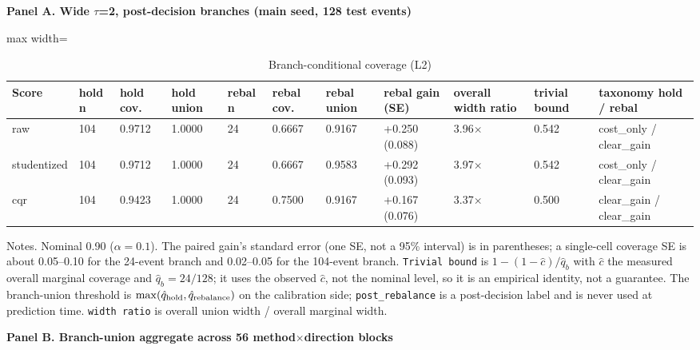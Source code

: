 \begin{table}[!htbp]
\centering
\scriptsize
\caption{Branch-conditional coverage (L2)}
\label{tab:4}
\vspace{0.5em}
\par\textbf{Panel A. Wide $\tau$=2, post-decision branches (main seed, 128 test events)}
\vspace{0.1em}

\begin{adjustbox}{max width=\linewidth}
\begin{tabular}{@{}lllllllllll@{}}
\toprule
Score & hold n & hold cov. & hold union & rebal n & rebal cov. & rebal union & rebal gain (SE) & overall width ratio & trivial bound & taxonomy hold / rebal \\
\midrule
raw & 104 & 0.9712 & 1.0000 & 24 & 0.6667 & 0.9167 & +0.250 (0.088) & 3.96$\times$ & 0.542 & cost\_only / clear\_gain \\
studentized & 104 & 0.9712 & 1.0000 & 24 & 0.6667 & 0.9583 & +0.292 (0.093) & 3.97$\times$ & 0.542 & cost\_only / clear\_gain \\
cqr & 104 & 0.9423 & 1.0000 & 24 & 0.7500 & 0.9167 & +0.167 (0.076) & 3.37$\times$ & 0.500 & clear\_gain / clear\_gain \\
\bottomrule
\end{tabular}
\end{adjustbox}
\vspace{0.5em}
\par\noindent\begin{minipage}{\linewidth}\raggedright{\scriptsize Notes. Nominal 0.90 ($\alpha=0.1$). The paired gain's standard error (one SE, not a 95\% interval) is in parentheses; a single-cell coverage SE is about 0.05--0.10 for the 24-event branch and 0.02--0.05 for the 104-event branch. \texttt{Trivial bound} is $1-(1-\hat c)/\hat q_b$ with $\hat c$ the measured overall marginal coverage and $\hat q_b=24/128$; it uses the observed $\hat c$, not the nominal level, so it is an empirical identity, not a guarantee. The branch-union threshold is $\max(\hat q_{\rm hold},\hat q_{\rm rebalance})$ on the calibration side; \texttt{post\_rebalance} is a post-decision label and is never used at prediction time. \texttt{width ratio} is overall union width / overall marginal width.}\end{minipage}\par

\vspace{0.4em}
\par\textbf{Panel B. Branch-union aggregate across 56 method$\times$direction blocks}
\vspace{0.1em}


\end{table}
